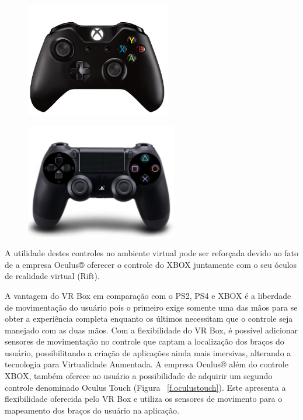 \begin{figure}[H]
	
	\begin{minipage}{.5\textwidth}{
			\centering
			\includegraphics[height=5cm]{Imagens/xbox.png}		
			\label{f.xbox}
		}
	\end{minipage}
	\begin{minipage}{.5\textwidth}{
			\centering
			\includegraphics[height=5cm]{Imagens/dualshock4.jpg}		
			\label{f.ps4}	
		}
	\end{minipage}
\end{figure}


A utilidade destes controles no ambiente virtual pode ser reforçada devido ao fato de a empresa Oculus® oferecer o controle do XBOX juntamente com o seu óculos de realidade virtual (Rift). \cite{oculushome} 

A vantagem do VR Box em comparação com o PS2, PS4 e XBOX é a liberdade de movimentação do usuário pois o primeiro exige somente uma das mãos para se obter a experiência completa enquanto os últimos necessitam que o controle seja manejado com as duas mãos. Com a flexibilidade do VR Box, é possível adicionar sensores de movimentação no controle que captam a localização dos braços do usuário, possibilitando a criação de aplicações ainda mais imersivas, alterando a tecnologia para Virtualidade Aumentada. A empresa Oculus® além do controle XBOX, também oferece ao usuário a possibilidade de adquirir um segundo controle denominado Oculus Touch (Figura ~\ref{f.oculustouch}). Este apresenta a flexibilidade oferecida pelo VR Box e utiliza os sensores de movimento para o mapeamento dos braços do usuário na aplicação. 

